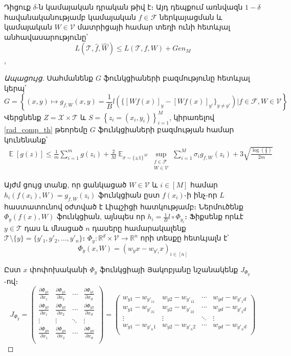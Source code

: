 \documentclass[11pt]{article}
\DeclareMathOperator*{\E}{\mathbb{E}}
\begin{document}
\begin{lemma}
\label{rad_lemma_main}
Դիցուք $\delta$-ն կամայական դրական թիվ է։ Այդ դեպքում առնվազն $1-\delta$ հավանականությամբ կամայական $f \in \mathcal{F}$ ներկայացման և կամայական $W \in \mathcal{V}$ մատրիցայի համար տեղի ունի հետևյալ անհավասարությունը՝
$$L(\mathcal{T}, \hat{f}, \hat{W}) \leq L(\mathcal{T}, f, W) + Gen_M$$,
\end{lemma}
\begin{proof}[Ապացույց]
 Սահմանենք $G$ ֆունկցիաների բազմությունը հետևյալ կերպ՝
$$G = \left \{ (x, y) \mapsto  g_{f, W}(x, y) = \frac{1}{B}l(\{[Wf(x)]_y - [Wf(x)]_{y'}\}_{y\neq y'}   ) | f \in \mathcal{F}, W \in \mathcal{V} \right \}$$
Վերցնենք $Z = \mathcal{X} \times \mathcal{T}$ և $S = \left \{z_i = (x_i, y_i) \right \}_{i=1}^M$, կիրառելով \ref{rad_comp_th} թեորեմը $G$ ֆունկցիաների բազմության համար կունենանք՝
\begin{align}
\label{rad_ineq_1}
\E[g(z)] \leq \frac{1}{m}\sum_{i=1}^mg(z_i) + \frac{2}{M}\E_{\sigma \sim \{\pm1\}^M} \sup_{\substack{ f  \in \mathcal{F}  \\ W \in \mathcal{V}}}\sum_{i=1}^M \sigma_ig_{f,W}(z_i) +    3\sqrt{\frac{\log \left( \frac{2}{\delta} \right)}{2m}}
\end{align}

Այժմ ցույց տանք, որ ցանկացած $W \in \mathcal{V}$  և $i \in [M]$ համար $h_i(f(x_i), W) = g_{f,W}(z_i)$ ֆունկցիան ըստ $f(x_i)$-ի ինչ-որ $L$ հաստատունով օժտված է Լիպշիցի հատկությամբ։ Ներմուծենք $\Phi_y(f(x), W)$ ֆունկցիան, այնպես որ $h_i = \frac{1}{B} l \circ \Phi_{y_i}$։ Ֆիքսենք որևէ $y \in \mathcal{T}$ դաս և մնացած $n$ դասերը համարակալենք  $\mathcal{T} \setminus \{y\} =\{y'_1, y'_2, ..., y'_n\} $։ $\Phi_y : \mathbb{R}^d \times \mathcal{V} \rightarrow \mathbb{R}^n$ որի տեսքը հետևյալն է՝
$$\Phi_y(x, W) = (w_yx-w_{y'_{i}}x)_{i \in [n]}$$

Ըստ $x$ փոփոխականի $\Phi_y$  ֆունկցիայի Յակոբյանը նշանակենք $J_{\Phi_y} $-ով։
$$J_{\Phi_y}  = 
 \begin{pmatrix}
 \frac{\partial \Phi_{y1}}{\partial x_1} & \frac{\partial \Phi_{y1}}{\partial x_2} & \cdots & \frac{\partial \Phi_{y1}}{\partial x_d} \\
  \frac{\partial \Phi_{y2}}{\partial x_1} & \frac{\partial \Phi_{y2}}{\partial x_2} & \cdots & \frac{\partial \Phi_{y2}}{\partial x_d} \\
  \vdots  & \vdots  & \ddots & \vdots  \\
  \frac{\partial \Phi_{yn}}{\partial x_1} & \frac{\partial \Phi_{yn}}{\partial x_2} & \cdots & \frac{\partial \Phi_{yn}}{\partial x_d} \\
 \end{pmatrix} =
 \begin{pmatrix}
 w_{y1} - w_{{y'}_11} & w_{y2} - w_{{y'}_12} & \cdots & w_{yd} - w_{{y'}_1d} \\
   w_{y1} - w_{{y'}_21} & w_{y2} - w_{{y'}_22} & \cdots & w_{yd} - w_{{y'}_2d} \\
  \vdots  & \vdots  & \ddots & \vdots  \\
  w_{y1} - w_{{y'}_n1} & w_{y2} - w_{{y'}_n2} & \cdots & w_{yd} - w_{{y'}_nd} \\
 \end{pmatrix}
 $$


\end{proof}
\end{document}
